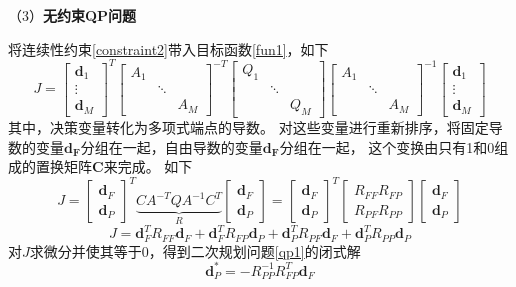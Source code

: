 （3）\textbf{无约束QP问题}


将连续性约束\ref{constraint2}带入目标函数\ref{fun1}，如下
\begin{equation}
    J=\begin{bmatrix}\mathbf{d}_1\\\vdots\\\mathbf{d}_M\end{bmatrix}^T\begin{bmatrix}A_1\\&\ddots\\&&A_M\end{bmatrix}^{-T}\begin{bmatrix}Q_1\\&\ddots\\&&Q_M\end{bmatrix}\begin{bmatrix}A_1\\&\ddots\\&&A_M\end{bmatrix}^{-1}\begin{bmatrix}\mathbf{d}_1\\\vdots\\\mathbf{d}_M\end{bmatrix}
\end{equation}
其中，决策变量转化为多项式端点的导数。
对这些变量进行重新排序，将固定导数的变量$\mathbf{d_F}$分组在一起，自由导数的变量$\mathbf{d_F}$分组在一起，
这个变换由只有1和0组成的置换矩阵$\mathbf{C}$来完成。
如下
\begin{equation}
    J=\begin{bmatrix}\mathbf{d}_F\\\mathbf{d}_P\end{bmatrix}^T\underbrace{CA^{-T}QA^{-1}C^T}_R\begin{bmatrix}\mathbf{d}_F\\\mathbf{d}_P\end{bmatrix}=\begin{bmatrix}\mathbf{d}_F\\\mathbf{d}_P\end{bmatrix}^T\begin{bmatrix}R_{FF} R_{FP}\\R_{PF} R_{PP}\end{bmatrix}\begin{bmatrix}\mathbf{d}_F\\\mathbf{d}_P\end{bmatrix}
\end{equation}
\begin{equation}\label{qp1}
    J=\mathbf{d}_F^TR_{FF}\mathbf{d}_F+\mathbf{d}_F^TR_{FP}\mathbf{d}_P+\mathbf{d}_P^TR_{PF}\mathbf{d}_F+\mathbf{d}_P^TR_{PP}\mathbf{d}_P
\end{equation}
对$J$求微分并使其等于0，得到二次规划问题\ref{qp1}的闭式解
\begin{equation}
    \mathbf{d}_P^*=-R_{PP}^{-1}R_{FP}^T\mathbf{d}_F
\end{equation}


